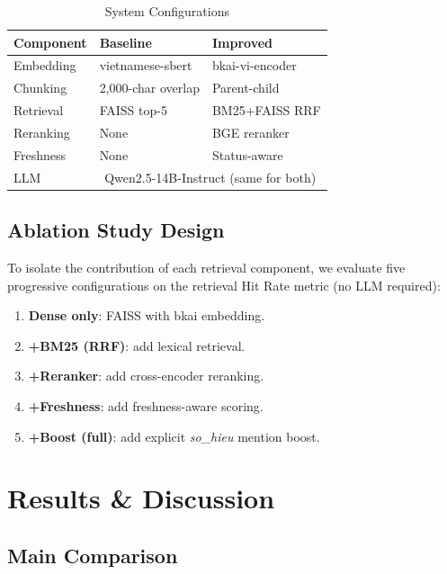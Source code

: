 \documentclass[conference]{IEEEtran}
\begin{document}
\begin{table}[h]
\caption{System Configurations}
\label{tab:configs}
\centering
\begin{tabular}{lll}
\toprule
\textbf{Component} & \textbf{Baseline} & \textbf{Improved} \\
\midrule
Embedding       & vietnamese-sbert     & bkai-vi-encoder \\
Chunking        & 2,000-char overlap   & Parent-child \\
Retrieval       & FAISS top-5          & BM25+FAISS RRF \\
Reranking       & None                 & BGE reranker \\
Freshness       & None                 & Status-aware \\
LLM             & \multicolumn{2}{c}{Qwen2.5-14B-Instruct (same for both)} \\
\bottomrule
\end{tabular}
\end{table}

\subsection{Ablation Study Design}

To isolate the contribution of each retrieval component, we evaluate five
progressive configurations on the retrieval Hit Rate metric
(no LLM required):

\begin{enumerate}
  \item \textbf{Dense only}: FAISS with bkai embedding.
  \item \textbf{+BM25 (RRF)}: add lexical retrieval.
  \item \textbf{+Reranker}: add cross-encoder reranking.
  \item \textbf{+Freshness}: add freshness-aware scoring.
  \item \textbf{+Boost (full)}: add explicit \emph{so\_hieu} mention boost.
\end{enumerate}

\section{Results \& Discussion}

\subsection{Main Comparison}
\end{document}
